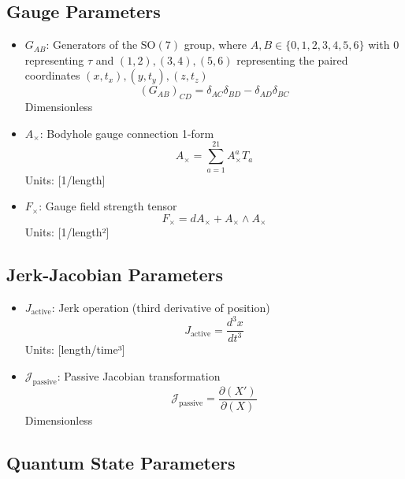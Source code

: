 \documentclass{article}
\begin{document}
\subsection{Gauge Parameters}

\begin{itemize}
\item $G_{AB}$: Generators of the $\text{SO}(7)$ group, where $A,B \in \{0,1,2,3,4,5,6\}$ with $0$ representing $\tau$ and $(1,2), (3,4), (5,6)$ representing the paired coordinates $(x,t_x), (y,t_y), (z,t_z)$
    \begin{equation}
    (G_{AB})_{CD} = \delta_{AC}\delta_{BD} - \delta_{AD}\delta_{BC}
    \end{equation}
    Dimensionless
    
\item $A_\times$: Bodyhole gauge connection 1-form
    \begin{equation}
    A_\times = \sum_{a=1}^{21} A^a_\times T_a
    \end{equation}
    Units: [1/length]
    
\item $F_\times$: Gauge field strength tensor
    \begin{equation}
    F_\times = dA_\times + A_\times \wedge A_\times
    \end{equation}
    Units: [1/length²]
\end{itemize}

\subsection{Jerk-Jacobian Parameters}

\begin{itemize}
\item $J_{\text{active}}$: Jerk operation (third derivative of position)
    \begin{equation}
    J_{\text{active}} = \frac{d^3x}{dt^3}
    \end{equation}
    Units: [length/time³]
    
\item $\mathcal{J}_{\text{passive}}$: Passive Jacobian transformation
    \begin{equation}
    \mathcal{J}_{\text{passive}} = \frac{\partial(X')}{\partial(X)}
    \end{equation}
    Dimensionless
\end{itemize}

\subsection{Quantum State Parameters}
\end{document}
